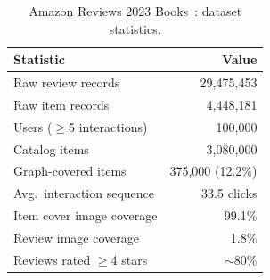 \begin{table}[t]
\centering
\caption{Amazon Reviews 2023 Books~\cite{hou2024amazon}: dataset statistics.}
\label{tab:dataset}
\begin{tabular}{lr}
\toprule
\textbf{Statistic} & \textbf{Value} \\
\midrule
Raw review records            & 29,475,453        \\
Raw item records              & 4,448,181         \\
Users ($\geq$5 interactions)  & 100,000           \\
Catalog items                 & 3,080,000         \\
Graph-covered items           & 375,000 (12.2\%)  \\
Avg.\ interaction sequence    & 33.5 clicks       \\
Item cover image coverage     & 99.1\%            \\
Review image coverage         & 1.8\%             \\
Reviews rated $\geq$4 stars   & $\sim$80\%        \\
\bottomrule
\end{tabular}
\end{table}
